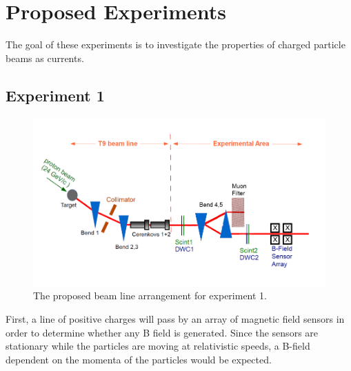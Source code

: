 \documentclass[12pt,letterpaper]{article}
\begin{document}
\section{Proposed Experiments}
The goal of these experiments is to investigate the properties of charged particle beams as currents.

\subsection{Experiment 1}
\begin{figure}[H]
\label{experiment_setup1}
  \centering
\includegraphics[]{experimental_setup1.png} %
 \caption{The proposed beam line arrangement for experiment 1.}
\end{figure}
First, a line of positive charges will pass by an array of magnetic field sensors in order to determine whether any B field is generated. Since the sensors are stationary while the particles are moving at relativistic speeds, a B-field dependent on the momenta of the particles would be expected.
\end{document}
